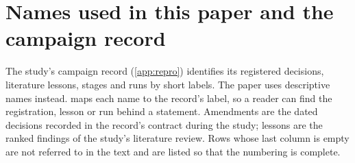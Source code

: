 %

\section{Names used in this paper and the campaign record}
\label{app:provenance}

The study's campaign record (\cref{app:repro}) identifies its registered decisions, literature
lessons, stages and runs by short labels. The paper uses descriptive names instead.
 maps each name to the record's label, so a reader can find the registration,
lesson or run behind a statement. Amendments are the dated decisions recorded in the record's
contract during the study; lessons are the ranked findings of the study's literature review. Rows whose last column is empty are not referred to in the text and are
listed so that the numbering is complete.

\newcommand{\LTgrouprule}{%
  \noalign{\nobreak\vskip\aboverulesep}%
  \multispan{3}\leaders\hrule height \lightrulewidth\hfill\cr
  \noalign{\nobreak\vskip\belowrulesep}}

